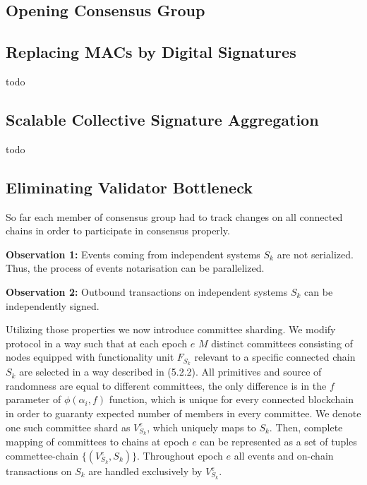 \subsection{Opening Consensus Group}\label{subsec:opening-consensus-group-and-leaders}


\subsection{Replacing MACs by Digital Signatures}\label{subsec:replacing-macs-by-digital-signatures}

todo

\subsection{Scalable Collective Signature Aggregation}\label{subsec:scalable-collective-signature-aggregation}

todo

\subsection{Eliminating Validator Bottleneck}\label{subsec:eliminating-validator-bottleneck}

So far each member of consensus group had to track changes on all connected chains in order to participate in consensus properly.

\textbf{Observation 1:} Events coming from independent systems $S_k$ are not serialized.
Thus, the process of events notarisation can be parallelized.

\textbf{Observation 2:} Outbound transactions on independent systems $S_k$ can be independently signed.

Utilizing those properties we now introduce committee sharding.
We modify protocol in a way such that at each epoch $e$ $M$ distinct committees consisting of nodes equipped with functionality unit $F_{S_k}$ relevant to a specific connected chain $S_k$ are selected in a way described in (5.2.2).
All primitives and source of randomness are equal to different committees, the only difference is in the $f$ parameter of $\phi(\alpha_i, f)$ function, which is unique for every connected blockchain in order to guaranty expected number of members in every committee.
We denote one such committee shard as $V^{e}_{S_k}$, which uniquely maps to $S_k$.
Then, complete mapping of committees to chains at epoch $e$ can be represented as a set of tuples commettee-chain $\{(V^{e}_{S_k}, S_k)\}$.
Throughout epoch $e$ all events and on-chain transactions on $S_k$ are handled exclusively by $V^{e}_{S_k}$.

